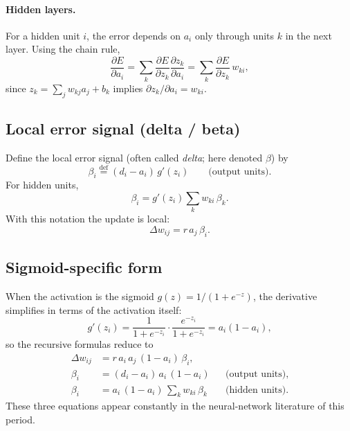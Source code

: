 \documentclass[12pt]{article}
\begin{document}
\paragraph{Hidden layers.}
For a hidden unit $i$, the error depends on $a_i$ only through units $k$ in the next layer. Using the chain rule,
\begin{equation}
  \frac{\partial E}{\partial a_i}
  = \sum_k \frac{\partial E}{\partial z_k}\frac{\partial z_k}{\partial a_i}
  = \sum_k \frac{\partial E}{\partial z_k}\, w_{k i},
\end{equation}
since $z_k = \sum_j w_{k j} a_j + b_k$ implies $\partial z_k/\partial a_i = w_{k i}$.

\subsection{Local error signal (delta / beta)}
Define the local error signal (often called \emph{delta}; here denoted $\beta$) by
\begin{equation}
  \beta_i \stackrel{\mathrm{def}}{=} (d_i-a_i)\,g'(z_i)
  \qquad\text{(output units)}.
\end{equation}
For hidden units,
\begin{equation}
  \beta_i = g'(z_i)\sum_k w_{k i}\,\beta_k.
\end{equation}
With this notation the update is local:
\begin{equation}
  \Delta w_{ij} = r\, a_j\, \beta_i.
\end{equation}

\subsection{Sigmoid-specific form}
When the activation is the sigmoid $g(z) = 1/(1+e^{-z})$, the derivative simplifies in terms of the activation itself:
\begin{equation}
  g'(z_i) = \frac{1}{1+e^{-z_i}} \cdot \frac{e^{-z_i}}{1+e^{-z_i}} = a_i(1-a_i),
\end{equation}
so the recursive formulas reduce to
\begin{align}
  \Delta w_{ij} &= r\, a_i\, a_j\, (1-a_i)\, \beta_i,\\
  \beta_i &= (d_i - a_i)\, a_i\, (1-a_i) && \text{(output units)},\\
  \beta_i &= a_i\, (1-a_i)\, \sum_k w_{ki}\, \beta_k && \text{(hidden units)}.
\end{align}
These three equations appear constantly in the neural-network literature of this period.
\end{document}
